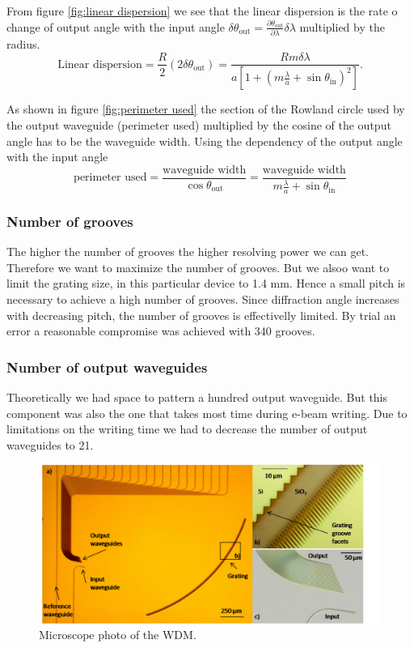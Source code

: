 \documentclass[12pt,twoside,english]{book}
\renewcommand{\~}{\perispomeni}%
\numberwithin{equation}{section}
\numberwithin{figure}{section}
\begin{document}
From figure \ref{fig:linear dispersion} we see that the linear dispersion is the rate o change of output angle with the input angle $\delta\theta_{\text{out}}=\frac{\partial\theta_{\text{out}}}{\partial\lambda}\delta\lambda$ multiplied by the radius.
\begin{equation}
\text{Linear dispersion}=\frac{R}{2}\left(2\delta\theta_{\text{out}}\right)=\frac{Rm\delta\lambda}{a\left[1+\left(m\frac{\lambda}{a}+\sin\theta_{\text{in}}\right)^{2}\right]}.
\label{eq:linear dispersion}
\end{equation}

As shown in figure \ref{fig:perimeter used} the section of the Rowland circle used by the output waveguide (perimeter used) multiplied by the cosine of the output angle has to be the waveguide width. Using the dependency of the output angle with the input angle
\begin{equation}
\text{perimeter used}
=\frac{\text{waveguide width}}{\cos\theta_{\text{out}}}
=\frac{\text{waveguide width}}{m\frac{\lambda}{a}+\sin\theta_{\text{in}}}
\label{eq:perimeter used}
\end{equation}

\subsubsection{Number of grooves}
The higher the number of grooves the higher resolving power we can get. Therefore we want to maximize the number of grooves. But we alsoo want to limit the grating size, in this particular device to 1.4 mm. Hence a small pitch is necessary to achieve a high number of grooves. Since diffraction angle increases with decreasing pitch, the number of grooves is effectivelly limited. By trial an error a reasonable compromise was achieved with 340 grooves. 

\subsubsection{Number of output waveguides}
Theoretically we had space to pattern a hundred output waveguide. But this component was also the one that takes most time during e-beam writing. Due to limitations on the writing time we had to decrease the number of output waveguides to 21.
\begin{figure}[h]
\centering\includegraphics[width=1\textwidth]{./wdm}
\caption{Microscope photo of the WDM.}
\end{figure}
\end{document}
